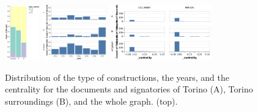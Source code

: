 \begin{figure}[h]
    \centering



    \includegraphics[height=90px]{static/figures/ComBiNet/OriginalPaperFigures/CGF/TurinPlots/type+chantier.pdf}
    \includegraphics[height=90px]{static/figures/ComBiNet/OriginalPaperFigures/CGF/TurinPlots/time.pdf}
    \includegraphics[height=90px]{static/figures/ComBiNet/OriginalPaperFigures/CGF/TurinPlots/centrality.pdf}

    \caption{Distribution of the type of constructions, the years, and the centrality for the documents and signatories of Torino (A), Torino surroundings (B), and the whole graph. (top).}\label{fig:attributeComparison}
\end{figure}


